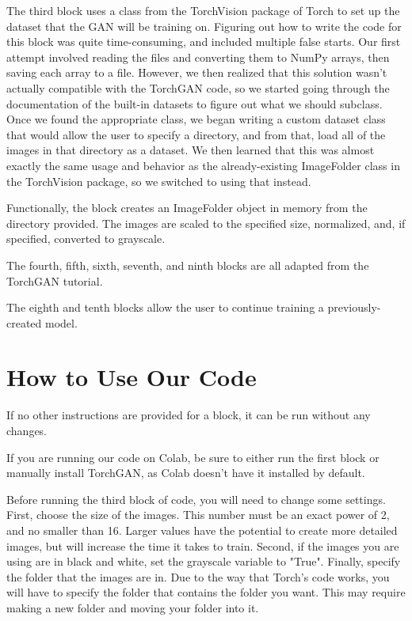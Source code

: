 \documentclass[12pt,letterpaper]{article}
\begin{document}
		The third block uses a class from the TorchVision package of Torch to set up the dataset that the GAN will be training on.
		Figuring out how to write the code for this block was quite time-consuming, and included multiple false starts.
		Our first attempt involved reading the files and converting them to NumPy arrays, then saving each array to a file.
		However, we then realized that this solution wasn't actually compatible with the TorchGAN code, so we started going through the documentation of the built-in datasets to figure out what we should subclass.
		Once we found the appropriate class, we began writing a custom dataset class that would allow the user to specify a directory, and from that, load all of the images in that directory as a dataset.
		We then learned that this was almost exactly the same usage and behavior as the already-existing ImageFolder class in the TorchVision package, so we switched to using that instead.

		Functionally, the block creates an ImageFolder object in memory from the directory provided.
		The images are scaled to the specified size, normalized, and, if specified, converted to grayscale.

		The fourth, fifth, sixth, seventh, and ninth blocks are all adapted from the TorchGAN tutorial.

		The eighth and tenth blocks allow the user to continue training a previously-created model.

	\section{How to Use Our Code}
		If no other instructions are provided for a block, it can be run without any changes.

		If you are running our code on Colab, be sure to either run the first block or manually install TorchGAN, as Colab doesn't have it installed by default.

		Before running the third block of code, you will need to change some settings.
		First, choose the size of the images.
		This number must be an exact power of 2, and no smaller than 16.
		Larger values have the potential to create more detailed images, but will increase the time it takes to train.
		Second, if the images you are using are in black and white, set the grayscale variable to "True".
		Finally, specify the folder that the images are in.
		Due to the way that Torch's code works, you will have to specify the folder that contains the folder you want.
		This may require making a new folder and moving your folder into it.
\end{document}
